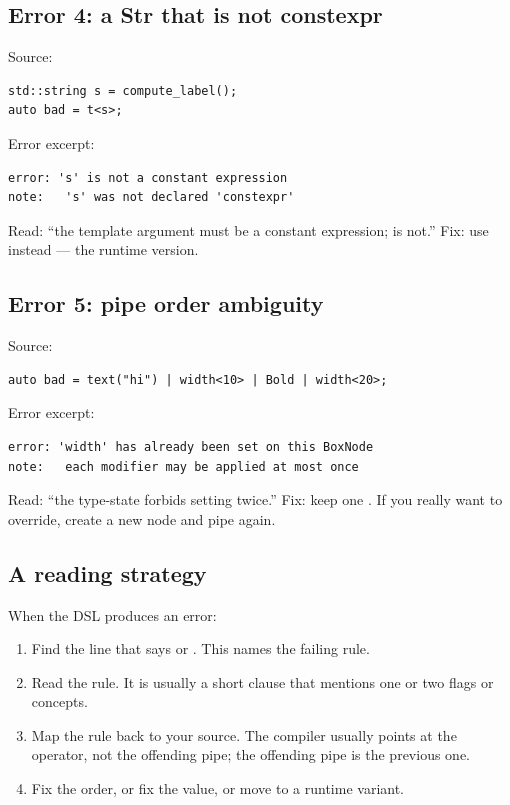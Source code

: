 \subsection*{Error 4: a Str that is not constexpr}

Source:

\begin{lstlisting}
std::string s = compute_label();
auto bad = t<s>;
\end{lstlisting}

Error excerpt:

\begin{lstlisting}
error: 's' is not a constant expression
note:   's' was not declared 'constexpr'
\end{lstlisting}

Read: ``the template argument must be a constant expression;
 is not.'' Fix: use  instead --- the runtime
version.

\subsection*{Error 5: pipe order ambiguity}

Source:

\begin{lstlisting}
auto bad = text("hi") | width<10> | Bold | width<20>;
\end{lstlisting}

Error excerpt:

\begin{lstlisting}
error: 'width' has already been set on this BoxNode
note:   each modifier may be applied at most once
\end{lstlisting}

Read: ``the type-state forbids setting  twice.''
Fix: keep one . If you really want to override,
create a new node and pipe again.

\subsection*{A reading strategy}

When the DSL produces an error:

\begin{enumerate}[leftmargin=*]
  \item Find the line that says 
    or . This names the failing rule.
  \item Read the rule. It is usually a short 
    clause that mentions one or two flags or concepts.
  \item Map the rule back to your source. The compiler usually
    points at the operator, not the offending pipe; the offending
    pipe is the previous one.
  \item Fix the order, or fix the value, or move to a runtime
    variant.
\end{enumerate}

